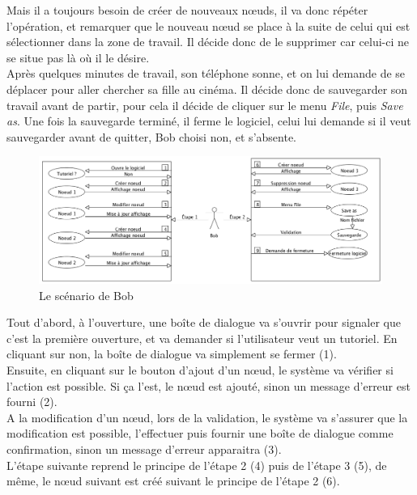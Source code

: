 \documentclass[12pt, a4paper]{article}
\begin{document}
Mais il a toujours besoin de créer de nouveaux nœuds, il va donc répéter l'opération, et remarquer que le nouveau nœud se place à la suite de celui qui est sélectionner dans la zone de travail. Il décide donc de le supprimer car celui-ci ne se situe pas là où il le désire.\\


Après quelques minutes de travail, son téléphone sonne, et on lui demande de se déplacer pour aller chercher sa fille au cinéma. Il décide donc de sauvegarder son travail avant de partir, pour cela il décide de cliquer sur le menu \emph{File}, puis \emph{Save as}. Une fois la sauvegarde terminé, il ferme le logiciel, celui lui demande si il veut sauvegarder avant de quitter, Bob choisi non, et s'absente.\\

\newpage
\begin{figure}[h]
\begin{center}
   \includegraphics[scale = 0.4]{scenario-bob.png}
	\caption{Le scénario de Bob}
	\end{center}
\end{figure}

Tout d'abord, à l'ouverture, une boîte de dialogue va s'ouvrir pour signaler que c'est la première ouverture, et va demander si l'utilisateur veut un tutoriel. En cliquant sur non, la boîte de dialogue va simplement se fermer (1).\\ 


Ensuite, en cliquant sur le bouton d'ajout d'un nœud, le système va vérifier si l'action est possible. Si ça l'est, le nœud est ajouté, sinon un message d'erreur est fourni (2).\\ 


A la modification d'un nœud, lors de la validation, le système va s'assurer que la modification est possible, l'effectuer puis fournir une boîte de dialogue comme confirmation, sinon un message d'erreur apparaitra (3).\\  


L'étape suivante reprend le principe de l'étape 2 (4) puis de l'étape 3 (5), de même, le nœud suivant est créé suivant le principe de l'étape 2 (6).\\ 
\end{document}
